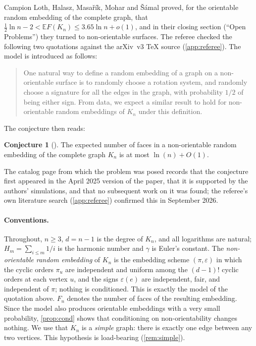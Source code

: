 \documentclass[11pt,a4paper]{article}
\theoremstyle{plain}
\theoremstyle{definition}
\newtheorem{conjecture}[theorem]{Conjecture}
\theoremstyle{remark}
\newcommand{\E}{\mathbb E}
\begin{document}
Campion Loth, Halasz, Masařík, Mohar and Šámal \cite{CHMMS} proved, for the orientable random embedding of the complete graph, that $\tfrac12\ln n-2<\E F(K_n)\le3.65\ln n+o(1)$, and in their closing section (``Open Problems'') they turned to non-orientable surfaces. The referee checked the following two quotations against the arXiv~v3 \TeX{} source (\cref{app:referee}). The model is introduced as follows:
\begin{quote}
One natural way to define a random embedding of a graph on a non-orientable surface is to randomly choose a rotation system, and randomly choose a signature for all the edges in the graph, with probability $1/2$ of being either sign. From data, we expect a similar result to hold for non-orientable random embeddings of $K_n$ under this definition.
\end{quote}
The conjecture then reads:
\begin{conjecture}[{\cite[Conjecture~9.5]{CHMMS}}]\label{conj:95}
The expected number of faces in a non-orientable random embedding of the complete graph $K_{n}$ is at most $\ln(n) + O(1)$.
\end{conjecture}
The catalog page from which the problem was posed records that the conjecture first appeared in the April 2025 version of the paper, that it is supported by the authors' simulations, and that no subsequent work on it was found; the referee's own literature search (\cref{app:referee}) confirmed this in September 2026.

\paragraph{Conventions.}
Throughout, $n\ge3$, $d=n-1$ is the degree of $K_n$, and all logarithms are natural; $H_m=\sum_{i\le m}1/i$ is the harmonic number and $\gamma$ is Euler's constant. The \emph{non-orientable random embedding} of $K_n$ is the embedding scheme $(\pi,\varepsilon)$ in which the cyclic orders $\pi_u$ are independent and uniform among the $(d-1)!$ cyclic orders at each vertex $u$, and the signs $\varepsilon(e)$ are independent, fair, and independent of $\pi$; nothing is conditioned. This is exactly the model of the quotation above. $F_n$ denotes the number of faces of the resulting embedding. Since the model also produces orientable embeddings with a very small probability, \cref{prop:cond} shows that conditioning on non-orientability changes nothing. We use that $K_n$ is a \emph{simple} graph: there is exactly one edge between any two vertices. This hypothesis is load-bearing (\cref{rem:simple}).
\end{document}
